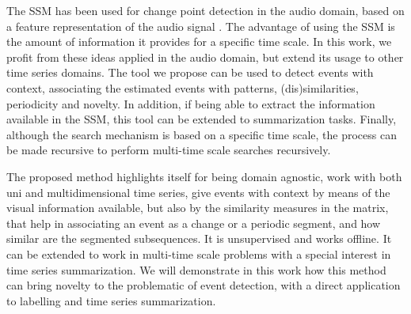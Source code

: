 \par
The \gls{SSM} has been used for change point detection in the audio domain, based on a feature representation of the audio signal \cite{MuellerZ19_FMP_ISMIR}. The advantage of using the \gls{SSM} is the amount of information it provides for a specific time scale. In this work, we profit from these ideas applied in the audio domain, but extend its usage to other time series domains. The tool we propose can be used to detect events with context, associating the estimated events with patterns, (dis)similarities, periodicity and novelty. In addition, if being able to extract the information available in the \gls{SSM}, this tool can be extended to summarization tasks. Finally, although the search mechanism is based on a specific time scale, the process can be made recursive to perform multi-time scale searches recursively.
\par
The proposed method highlights itself for being domain agnostic, work with both uni and multidimensional time series, give events with context by means of the visual information available, but also by the similarity measures in the matrix, that help in associating an event as a change or a periodic segment, and how similar are the segmented subsequences. It is unsupervised and works offline. It can be extended to work in multi-time scale problems with a special interest in time series summarization. We will demonstrate in this work how this method can bring novelty to the problematic of event detection, with a direct application to labelling and time series summarization.




